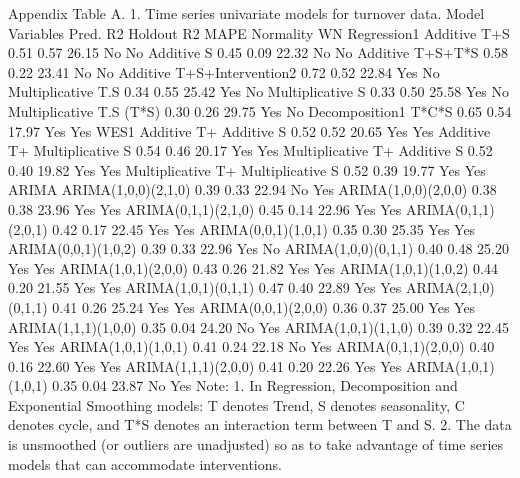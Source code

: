 Appendix
Table A. 1. Time series univariate models for turnover data.
Model	Variables	Pred. R2	Holdout R2	MAPE	Normality	WN
Regression1	Additive T+S	0.51	0.57	26.15	No	No
Additive S	0.45	0.09	22.32	No	No
Additive T+S+T*S	0.58	0.22	23.41	No	No
Additive T+S+Intervention2	0.72	0.52	22.84	Yes	No
Multiplicative T.S	0.34	0.55	25.42	Yes	No
Multiplicative S	0.33	0.50	25.58	Yes	No
Multiplicative T.S (T*S)	0.30	0.26	29.75	Yes	No
Decomposition1	T*C*S	0.65	0.54	17.97	Yes	Yes
WES1	Additive T+ Additive S	0.52	0.52	20.65	Yes	Yes
Additive T+ Multiplicative S	0.54	0.46	20.17	Yes	Yes
Multiplicative T+ Additive S	0.52	0.40	19.82	Yes	Yes
Multiplicative T+ Multiplicative S	0.52	0.39	19.77	Yes	Yes
ARIMA	ARIMA(1,0,0)(2,1,0)	0.39	0.33	22.94	No	Yes
ARIMA(1,0,0)(2,0,0)	0.38	0.38	23.96	Yes	Yes
ARIMA(0,1,1)(2,1,0)	0.45	0.14	22.96	Yes	Yes
ARIMA(0,1,1)(2,0,1)	0.42	0.17	22.45	Yes	Yes
ARIMA(0,0,1)(1,0,1)	0.35	0.30	25.35	Yes	Yes
ARIMA(0,0,1)(1,0,2)	0.39	0.33	22.96	Yes	No
ARIMA(1,0,0)(0,1,1)	0.40	0.48	25.20	Yes	Yes
ARIMA(1,0,1)(2,0,0)	0.43	0.26	21.82	Yes	Yes
ARIMA(1,0,1)(1,0,2)	0.44	0.20	21.55	Yes	Yes
ARIMA(1,0,1)(0,1,1)	0.47	0.40	22.89	Yes	Yes
ARIMA(2,1,0)(0,1,1)	0.41	0.26	25.24	Yes	Yes
ARIMA(0,0,1)(2,0,0)	0.36	0.37	25.00	Yes	Yes
ARIMA(1,1,1)(1,0,0)	0.35	0.04	24.20	No	Yes
ARIMA(1,0,1)(1,1,0)	0.39	0.32	22.45	Yes	Yes
ARIMA(1,0,1)(1,0,1)	0.41	0.24	22.18	No	Yes
ARIMA(0,1,1)(2,0,0)	0.40	0.16	22.60	Yes	Yes
ARIMA(1,1,1)(2,0,0)	0.41	0.20	22.26	Yes	Yes
ARIMA(1,0,1)(1,0,1)	0.35	0.04	23.87	No	Yes
Note: 1. In Regression, Decomposition and Exponential Smoothing models: T denotes Trend, S denotes seasonality, C denotes cycle, and T*S denotes an interaction term between T and S. 
2. The data is unsmoothed (or outliers are unadjusted) so as to take advantage of time series models that can accommodate interventions.


